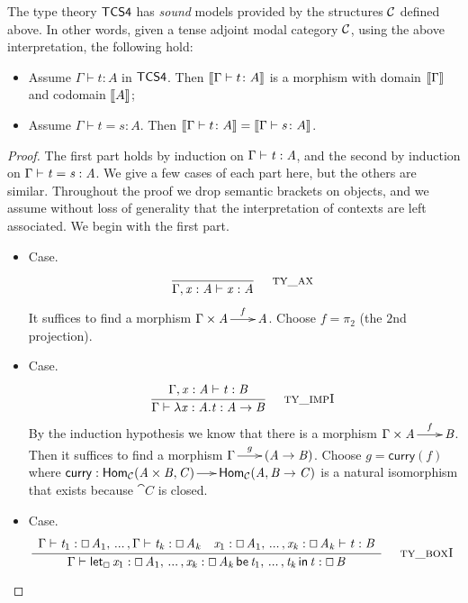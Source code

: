 \begin{theorem}
\label{thm:tcs4-csound}
The type theory $\sf{TCS4}$ has \textit{sound} models provided by the
structures $\cal C$ defined above.  In other words, given a tense
adjoint modal category $\cal C$, using the above interpretation, the
following hold:
\begin{itemize}
\item Assume $\Gamma \vdash t : A$ in $\sf{TCS4}$. Then $\sem{\Gamma
  \vdash t \colon A}$ is a morphism with domain $\sem{\Gamma}$ and
  codomain $\sem{A}$;
\item Assume $\Gamma \vdash t = s \colon A$. Then $\sem{\Gamma
  \vdash t \colon A} = \sem{\Gamma \vdash s \colon A}$.
\end{itemize}
\end{theorem}
\begin{proof}
  The first part holds by induction on $\Gamma  \vdash  \TLLnt{t}  \TLLsym{:}  \TLLnt{A}$, and the
  second by induction on $ \Gamma  \vdash  \TLLnt{t}  =  \TLLnt{s}  :  \TLLnt{A} $.  We give a few cases of
  each part here, but the others are similar.  Throughout the proof we
  drop semantic brackets on objects, and we assume without loss of
  generality that the interpretation of contexts are left associated.
  We begin with the first part.

  \begin{itemize}
  \item[] Case.\\
    \[
    \TLLdruletyXXax{}
    \]
    It suffices to find a morphism $\Gamma \times \TLLnt{A} \mto^{f}
    \TLLnt{A}$.  Choose $f = \pi_2$ (the $2$nd projection).

    \item[] Case.\\
    \[
    \TLLdruletyXXimpI{}
    \]
    By the induction hypothesis we know that there is a morphism
    $\Gamma \times \TLLnt{A} \mto^f \TLLnt{B}$.  Then it suffices to find a
    morphism $\Gamma \mto^{g} (\TLLnt{A}  \to  \TLLnt{B})$.  Choose $g =
    \mathsf{curry}(f)$ where $\mathsf{curry} :
    \mathsf{Hom}_{\cat{C}}( \TLLnt{A}  \times  \TLLnt{B} ,\TLLnt{C}) \mto
    \mathsf{Hom}_{\cat{C}}(\TLLnt{A},\TLLnt{B}  \to  \TLLnt{C})$ is a natural isomorphism
    that exists because $\cat{C}$ is closed.

  \item[] Case.\\
    \[
    \TLLdruletyXXboxI{}
    \]


\end{itemize}
\end{proof}
